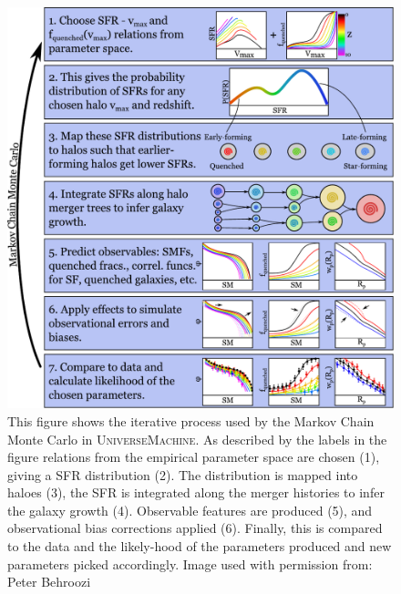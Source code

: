 \begin{figure}[h]
    \centering
    \includegraphics[width = \linewidth]{Figures/Chapter1/sfr_method.pdf}
    \caption{
    This figure shows the iterative process used by the Markov Chain Monte Carlo in U\textsc{niverse}M\textsc{achine}. As described by the labels in the figure relations from the empirical parameter space are chosen (1), giving a SFR distribution (2). The distribution is mapped into haloes (3), the SFR is integrated along the merger histories to infer the galaxy growth (4). Observable features are produced (5), and observational bias corrections applied (6). Finally, this is compared to the data and the likely-hood of the parameters produced and new parameters picked accordingly.
    Image used with permission from: Peter Behroozi \cite{Behroozi2019UniverseMachine:010}}
    \label{fig:BehMeth}
\end{figure}

